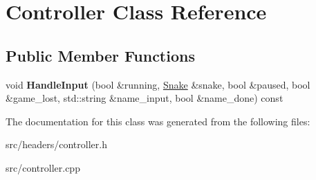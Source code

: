 \hypertarget{classController}{}\section{Controller Class Reference}
\label{classController}
\subsection*{Public Member Functions}
\begin{DoxyCompactItemize}
\item 
void {\bfseries Handle\+Input} (bool \&running, \hyperlink{classSnake}{Snake} \&snake, bool \&paused, bool \&game\+\_\+lost, std\+::string \&name\+\_\+input, bool \&name\+\_\+done) const \hypertarget{classController_af5f9e43573114ba13b3a3b7f7de94781}{}\label{classController_af5f9e43573114ba13b3a3b7f7de94781}

\end{DoxyCompactItemize}


The documentation for this class was generated from the following files\+:\begin{DoxyCompactItemize}
\item 
src/headers/controller.\+h\item 
src/controller.\+cpp\end{DoxyCompactItemize}
